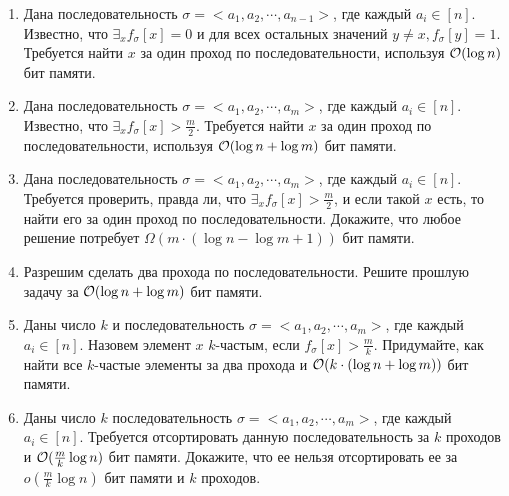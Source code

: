 \begin{enumerate}
  \item Дана последовательность $\sigma = <a_1, a_2, \cdots,
    a_{n-1}>$, где каждый $a_i \in [n]$. Известно, что $\exists_x
    f_\sigma[x] = 0$ и для всех остальных значений $y \ne x,
    f_\sigma[y] = 1$. Требуется найти $x$ за один проход по
    последовательности, используя $\mathcal{O}(\log{n})$ бит памяти.

  \item Дана последовательность $\sigma = <a_1, a_2, \cdots, a_m>$,
    где каждый $a_i \in [n]$. Известно, что $\exists_x f_\sigma[x] >
    \frac{m}{2}$. Требуется найти $x$ за один проход по
    последовательности, используя $\mathcal{O}(\log{n} + \log{m})$ бит памяти.

  \item Дана последовательность $\sigma = <a_1, a_2, \cdots, a_m>$,
    где каждый $a_i \in [n]$. Требуется проверить, правда ли, что
    $\exists_x f_\sigma[x] > \frac{m}{2}$, и если такой $x$ есть, то
    найти его за один проход по последовательности.
    Докажите, что любое решение потребует $\Omega(m \cdot (\log{n} -
    \log{m} + 1))$ бит памяти.

  \item Разрешим сделать два прохода по последовательности. Решите
    прошлую задачу за $\mathcal{O}(\log{n} + \log{m})$ бит памяти.

  \item Даны число $k$ и последовательность $\sigma = <a_1, a_2, \cdots, a_m>$,
    где каждый $a_i \in [n]$. Назовем элемент $x$ $k$-частым, если
    $f_\sigma[x] > \frac{m}{k}$. Придумайте, как найти все $k$-частые
    элементы за два прохода и $\mathcal{O}(k \cdot (\log{n} + \log{m}))$ бит памяти.

  \item Даны число $k$ последовательность $\sigma = <a_1, a_2, \cdots, a_m>$,
    где каждый $a_i \in [n]$.
    Требуется отсортировать данную последовательность за $k$ проходов
    и $\mathcal{O}(\frac{m}{k} \log{n})$ бит памяти. Докажите, что ее нельзя отсортировать ее
    за $o(\frac{m}{k} \log{n})$ бит памяти и $k$ проходов.

\end{enumerate}

\pagebreak
